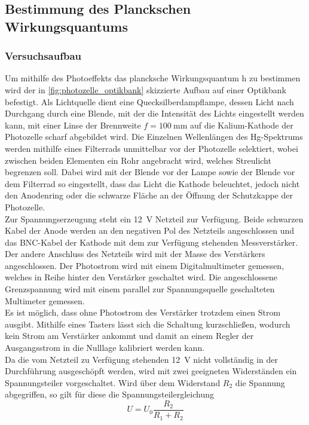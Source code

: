 \subsection{Bestimmung des Planckschen Wirkungsquantums}
\subsubsection{Versuchsaufbau}
Um mithilfe des Photoeffekts das plancksche Wirkungsquantum h zu bestimmen wird der
in \cref{fig:photozelle_optikbank} skizzierte Aufbau auf einer Optikbank befestigt.
Als Lichtquelle dient eine Quecksilberdampflampe, dessen Licht nach Durchgang durch eine
Blende, mit der die Intensität des Lichts eingestellt werden kann,
mit einer Linse der Brennweite $f=\SI{100}{\milli\meter}$ auf die Kalium-Kathode
der Photozelle scharf abgebildet wird. Die Einzelnen Wellenlängen des Hg-Spektrums
werden mithilfe eines Filterrads unmittelbar vor der Photozelle selektiert,
wobei zwischen beiden Elementen ein Rohr angebracht wird, welches Streulicht
begrenzen soll. Dabei wird mit der Blende vor der Lampe sowie der Blende vor
dem Filterrad so eingestellt, dass das Licht die Kathode beleuchtet, jedoch nicht
den Anodenring oder die schwarze Fläche an der Öffnung der Schutzkappe der Photozelle.\\

Zur Spannungserzeugung steht ein \SI{12}{\volt} Netzteil zur Verfügung. Beide schwarzen
Kabel der Anode werden an den negativen Pol des Netzteils angeschlossen und
das BNC-Kabel der Kathode mit dem zur Verfügung stehenden Messverstärker.
Der andere Anschluss des Netzteils wird mit der Masse des Verstärkers angeschlossen.
Der Photostrom wird mit einem Digitalmultimeter gemessen, welches in Reihe hinter
den Verstärker geschaltet wird.
Die angeschlossene Grenzspannung wird mit einem parallel zur Spannungsquelle
geschalteten Multimeter gemessen.\\

Es ist möglich, dass ohne Photostrom des Verstärker trotzdem einen Strom ausgibt.
Mithilfe eines Tasters lässt sich die Schaltung kurzschließen, wodurch kein Strom
am Verstärker ankommt und damit an einem Regler der Ausgangsstrom in die Nulllage
kalibriert werden kann.\\

Da die vom Netzteil zu Verfügung stehenden \SI{12}{\volt} nicht vollständig in der Durchführung
ausgeschöpft werden, wird mit zwei geeigneten Widerständen ein Spannungsteiler
vorgeschaltet. Wird über dem Widerstand $R_2$ die Spannung abgegriffen, so gilt für diese
die Spannungsteilergleichung
\begin{equation}
	U = U_0\frac{R_2}{R_1 + R_2}
	\label{eq:spannungsteiler}
\end{equation}



